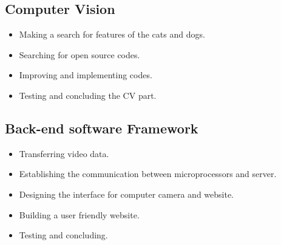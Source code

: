\subsection{Computer Vision} \label{sec:sol_proc} %
\begin{itemize}
\item Making a search for features of the cats and dogs.

\item Searching for open source codes. 

\item Improving and implementing codes. 

\item Testing and concluding the CV part.  

\end{itemize}
\subsection{Back-end software Framework} \label{sec:sol_proc} %
\begin{itemize}
\item Transferring video data. 

\item Establishing the communication between microprocessors and server.

\item Designing the interface for computer camera and website.

\item Building a user friendly website.

\item Testing and concluding.
\end{itemize}


